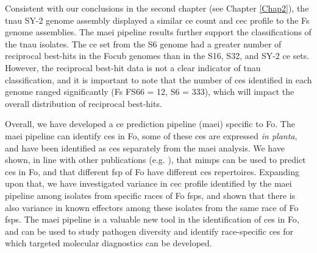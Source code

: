 Consistent with our conclusions in the second chapter (see Chapter \ref{Chap2}), the \ac{tnau} SY-2 genome assembly displayed a similar \ac{ce} count and \ac{cec} profile to the \ac{Fs} genome assemblies. The \ac{maei} pipeline results further support the classifications of the \ac{tnau} isolates. The \ac{ce} set from the S6 genome had a greater number of reciprocal best-hits in the \ac{Focub} genomes than in the S16, S32, and SY-2 \ac{ce} sets. However, the reciprocal best-hit data is not a clear indicator of \ac{tnau} classification, and it is important to note that the number of \acp{ce} identified in each genome ranged significantly (\ac{Fs} FS66 = 12, S6 = 333), which will impact the overall distribution of reciprocal best-hits. 

Overall, we have developed a \acl{ce} prediction pipeline (\ac{maei}) specific to \ac{Fo}. The \ac{maei} pipeline can identify \acp{ce} in \ac{Fo}, some of these \acp{ce} are expressed \textit{in planta}, and have been identified as \acp{ce} separately from the \ac{maei} analysis. We have shown, in line with other publications (e.g. \parencite{Schmidt2013, Dam2016, FoEC2}), that  \acp{mimp} can be used to predict \acp{ce} in \ac{Fo}, and that different \ac{fsp} of \ac{Fo} have different \acp{ce} repertoires. Expanding upon that, we have investigated variance in \ac{cec} profile identified by the \ac{maei} pipeline among isolates from specific races of \ac{Fo} \acp{fsp}, and shown that there is also variance in known effectors among these isolates from the same race of \ac{Fo} \acp{fsp}. The \ac{maei} pipeline is a valuable new tool in the identification of \acp{ce} in \ac{Fo}, and can be used to study pathogen diversity and identify race-specific \acp{ce} for which targeted molecular diagnostics can be developed. 